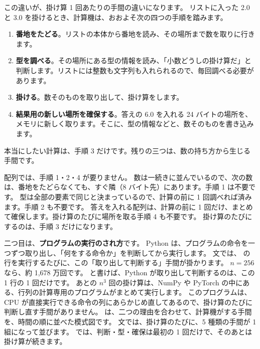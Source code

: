 この違いが、掛け算 1 回あたりの手間の違いになります。
リストに入った 2.0 と 3.0 を掛けるとき、計算機は、おおよそ次の四つの手順を踏みます。
\begin{enumerate}
\item \textbf{番地をたどる}。リストの本体から番地を読み、その場所まで数を取りに行きます。
\item \textbf{型を調べる}。その場所にある型の情報を読み、「小数どうしの掛け算だ」と判断します。リストには整数も文字列も入れられるので、毎回調べる必要があります。
\item \textbf{掛ける}。数そのものを取り出して、掛け算をします。
\item \textbf{結果用の新しい場所を確保する}。答えの 6.0 を入れる 24 バイトの場所を、メモリに新しく取ります。そこに、型の情報などと、数そのものを書き込みます。
\end{enumerate}
本当にしたい計算は、手順 3 だけです。残りの三つは、数の持ち方から生じる手間です。

配列では、手順 1・2・4 が要りません。
数は一続きに並んでいるので、次の数は、番地をたどらなくても、すぐ隣（8 バイト先）にあります。手順 1 は不要です。
型は全部の要素で同じと決まっているので、計算の前に 1 回調べれば済みます。手順 2 も不要です。
答えを入れる配列は、計算の前に 1 回だけ、まとめて確保します。掛け算のたびに場所を取る手順 4 も不要です。
掛け算のたびにするのは、手順 3 だけになります。

二つ目は、\textbf{プログラムの実行のされ方}です。
Python は、プログラムの命令を一つずつ取り出し、「何をする命令か」を判断してから実行します。
 文では、 の行を実行するたびに、この「取り出して判断する」手間が掛かります。
$n=256$ なら、約 1,678 万回です。
 と書けば、Python が取り出して判断するのは、この 1 行の 1 回だけです。
あとの $n^{3}$ 回の掛け算は、NumPy や PyTorch の中にある、行列の計算専用のプログラムがまとめて実行します。
このプログラムは、CPU が直接実行できる命令の列にあらかじめ直してあるので、掛け算のたびに判断し直す手間がありません。
は、二つの理由を合わせて、計算機がする手間を、時間の順に並べた模式図です。
 文では、掛け算のたびに、5 種類の手間が 1 組になって並びます。
 では、判断・型・確保は最初の 1 回だけで、そのあとは掛け算が続きます。

